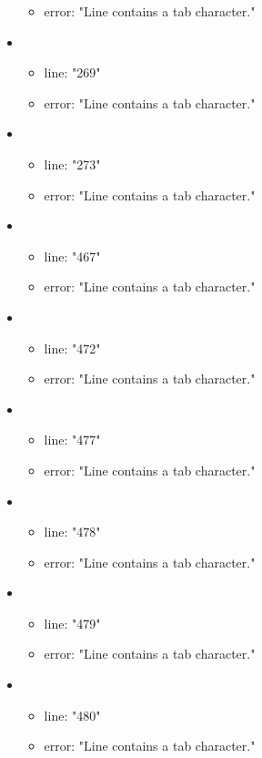 \begin{itemize}
\begin{itemize}
		\item error: "Line contains a tab character." 
	\end{itemize}
	\item 
	\begin{itemize} 
		\item line: "269" 
		\item error: "Line contains a tab character." 
	\end{itemize}
	\item 
	\begin{itemize} 
		\item line: "273" 
		\item error: "Line contains a tab character." 
	\end{itemize}
	\item 
	\begin{itemize} 
		\item line: "467" 
		\item error: "Line contains a tab character." 
	\end{itemize}
	\item 
	\begin{itemize} 
		\item line: "472" 
		\item error: "Line contains a tab character." 
	\end{itemize}
	\item 
	\begin{itemize} 
		\item line: "477" 
		\item error: "Line contains a tab character." 
	\end{itemize}
	\item 
	\begin{itemize} 
		\item line: "478" 
		\item error: "Line contains a tab character." 
	\end{itemize}
	\item 
	\begin{itemize} 
		\item line: "479" 
		\item error: "Line contains a tab character." 
	\end{itemize}
	\item 
	\begin{itemize} 
		\item line: "480" 
		\item error: "Line contains a tab character." 
	\end{itemize}

\end{itemize}

